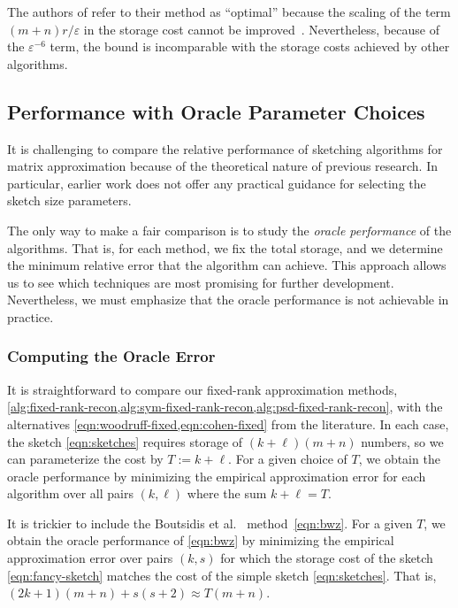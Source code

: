 \documentclass[final]{siamart1116}
\numberwithin{equation}{section}
\numberwithin{theorem}{section}
\numberwithin{figure}{section}
\newcommand{\eps}{\varepsilon}
\begin{document}
The authors of \cite{BWZ16:Optimal-Principal-STOC} refer to their method
as ``optimal'' because the scaling of the term $(m+n) r/\eps$ in the storage cost
cannot be improved~\cite[Thm.~4.10]{CW09:Numerical-Linear}.
Nevertheless, because of the $\eps^{-6}$ term, the bound is
incomparable with the storage costs achieved by other algorithms.
















\subsection{Performance with Oracle Parameter Choices}
\label{sec:oracle-params}

It is challenging to compare the relative performance of
sketching algorithms for matrix approximation
because of the theoretical nature of previous research.
In particular, earlier work does not offer any practical
guidance for selecting the sketch size parameters.

The only way to make a fair comparison is to study
the \emph{oracle performance} of the algorithms.
That is, for each method, we fix the total storage,
and we determine the minimum relative error that the
algorithm can achieve.  This approach allows us to
see which techniques are most promising for further
development.  Nevertheless, we must emphasize that
the oracle performance is not achievable in practice.

\subsubsection{Computing the Oracle Error}
\label{sec:oracle-error}

It is straightforward to compare our fixed-rank approximation methods, \cref{alg:fixed-rank-recon,alg:sym-fixed-rank-recon,alg:psd-fixed-rank-recon},
with the alternatives \cref{eqn:woodruff-fixed,eqn:cohen-fixed} from the literature.
In each case, the sketch \cref{eqn:sketches} requires storage
of $(k + \ell)(m + n)$ numbers, so we can parameterize
the cost by $T := k + \ell$.  For a given choice of $T$,
we obtain the oracle performance by minimizing
the empirical approximation error for each
algorithm over all pairs $(k, \ell)$ where the sum $k + \ell = T$.

It is trickier to include the Boutsidis et al.~\cite[Thm.~12]{BWZ16:Optimal-Principal-STOC} method~\cref{eqn:bwz}.
For a given $T$, we obtain the oracle performance of \cref{eqn:bwz}
by minimizing the empirical approximation error
over pairs $(k, s)$ for which the storage cost of
the sketch \cref{eqn:fancy-sketch}
matches the cost of the simple sketch \cref{eqn:sketches}.
That is, $(2k+1)(m+n) + s(s+2) \approx T(m + n)$.
\end{document}
